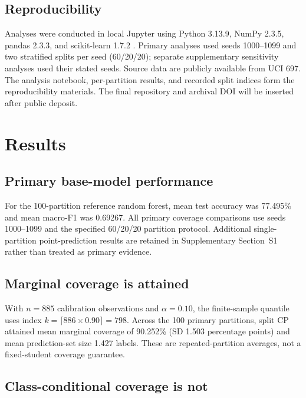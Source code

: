 \subsection{Reproducibility}

Analyses were conducted in local Jupyter using Python 3.13.9,
NumPy 2.3.5, pandas 2.3.3, and scikit-learn 1.7.2
\cite{pedregosa2011}. Primary analyses used seeds 1000--1099 and two
stratified splits per seed (60/20/20); separate supplementary
sensitivity analyses used their stated seeds. Source data are publicly
available from UCI 697. The analysis notebook, per-partition results,
and recorded split indices form the reproducibility materials. The
final repository and archival DOI will be inserted after public deposit.

\section{Results}\label{sec:results}

\subsection{Primary base-model performance}

For the 100-partition reference random forest, mean test accuracy was
77.495\% and mean macro-F1 was 0.69267. All primary coverage comparisons
use seeds 1000--1099 and the specified 60/20/20 partition protocol.
Additional single-partition point-prediction results are retained in
Supplementary Section~S1 rather than treated as primary evidence.

\subsection{Marginal coverage is attained}

With $n=885$ calibration observations and $\alpha=0.10$, the finite-sample
quantile uses index $k=\lceil 886\times0.90\rceil=798$.
Across the 100 primary partitions, split CP attained mean marginal coverage
of 90.252\% (SD 1.503 percentage points) and mean prediction-set size
1.427 labels. These are repeated-partition averages, not a fixed-student
coverage guarantee.

\subsection{Class-conditional coverage is not}

